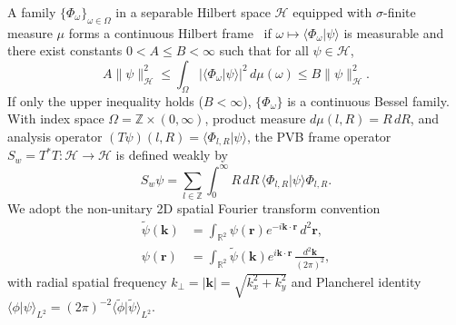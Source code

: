 \documentclass[aps,pra,onecolumn,notitlepage,11pt,tightenlines,amsmath,amssymb,floatfix,longbibliography]{revtex4-2}
\providecommand{\braket}[2]{\langle#1\vert#2\rangle}
\providecommand{\abs}[1]{\lvert#1\rvert}
\providecommand{\norm}[1]{\lVert#1\rVert}
\begin{document}
A family $\{\Phi_\omega\}_{\omega\in\Omega}$ in a separable Hilbert space $\mathcal{H}$ equipped with $\sigma$-finite measure $\mu$ forms a continuous Hilbert frame~\cite{Duffin1952,Daubechies1990,Ali1993,Christensen2016} if $\omega \mapsto \braket{\Phi_\omega}{\psi}$ is measurable and there exist constants $0 < A \le B < \infty$ such that for all $\psi \in \mathcal{H}$,
\begin{equation}
A \norm{\psi}_{\mathcal{H}}^2 \le \int_\Omega \abs{\braket{\Phi_\omega}{\psi}}^2\,d\mu(\omega) \le B \norm{\psi}_{\mathcal{H}}^2.
\label{eq:frame_def}
\end{equation}
If only the upper inequality holds ($B < \infty$), $\{\Phi_\omega\}$ is a continuous Bessel family. With index space $\Omega = \mathbb{Z} \times (0,\infty)$, product measure $d\mu(l,R) = R\,dR$, and analysis operator $(T\psi)(l,R) = \braket{\Phi_{l,R}}{\psi}$, the PVB frame operator $S_w = T^* T : \mathcal{H} \to \mathcal{H}$ is defined weakly by
\begin{equation}
S_w\psi = \sum_{l\in\mathbb{Z}} \int_0^\infty R\,dR\, \braket{\Phi_{l,R}}{\psi}\Phi_{l,R}.
\label{eq:frame_op}
\end{equation}
We adopt the non-unitary 2D spatial Fourier transform convention
\begin{align}
\widetilde{\psi}(\mathbf{k}) &= \int_{\mathbb{R}^2} \psi(\mathbf{r}) e^{-i\mathbf{k}\cdot\mathbf{r}}\,d^2\mathbf{r}, \nonumber \\
\psi(\mathbf{r}) &= \int_{\mathbb{R}^2} \widetilde{\psi}(\mathbf{k}) e^{i\mathbf{k}\cdot\mathbf{r}}\,\frac{d^2\mathbf{k}}{(2\pi)^2},
\label{eq:ft_convention}
\end{align}
with radial spatial frequency $k_\perp = \abs{\mathbf{k}} = \sqrt{k_x^2 + k_y^2}$ and Plancherel identity $\braket{\phi}{\psi}_{L^2} = (2\pi)^{-2}\braket{\widetilde{\phi}}{\widetilde{\psi}}_{L^2}$.
\end{document}
